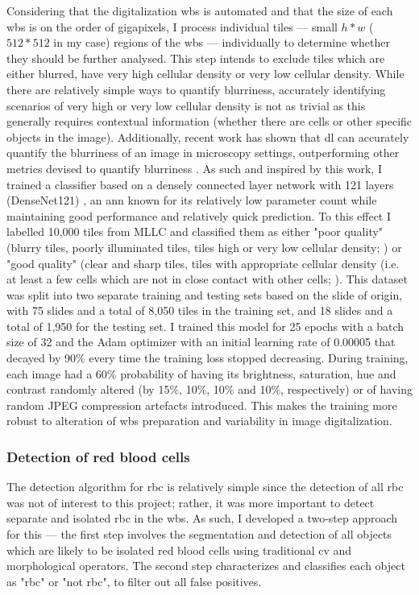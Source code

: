 Considering that the digitalization \ac{wbs} is automated and that the size of each \ac{wbs} is on the order of gigapixels, I process individual tiles --- small $h*w$ ($512*512$ in my case) regions of the \ac{wbs} --- individually to determine whether they should be further analysed. This step intends to exclude tiles which are either blurred, have very high cellular density or very low cellular density. While there are relatively simple ways to quantify blurriness, accurately identifying scenarios of very high or very low cellular density is not as trivial as this generally requires contextual information (whether there are cells or other specific objects in the image). Additionally, recent work has shown that \ac{dl} can accurately quantify the blurriness of an image in microscopy settings, outperforming other metrics devised to quantify blurriness \cite{Yang2018-ve}. As such and inspired by this work, I trained a classifier based on a densely connected layer network with 121 layers (DenseNet121) \cite{huang2017densely}, an \ac{ann} known for its relatively low parameter count while maintaining good performance and relatively quick prediction. To this effect I labelled 10,000 tiles from MLLC and classified them as either "poor quality" (blurry tiles, poorly illuminated tiles, tiles high or very low cellular density; ) or "good quality" (clear and sharp tiles, tiles with appropriate cellular density (i.e. at least a few cells which are not in close contact with other cells; ). This dataset was split into two separate training and testing sets based on the slide of origin, with 75 slides and a total of 8,050 tiles in the training set, and 18 slides and a total of 1,950 for the testing set. I trained this model for 25 epochs with a batch size of 32 and the Adam optimizer with an initial learning rate of 0.00005 that decayed by 90\% every time the training loss stopped decreasing. During training, each image had a 60\% probability of having its brightness, saturation, hue and contrast randomly altered (by 15\%, 10\%, 10\% and 10\%, respectively) or of having random JPEG compression artefacts introduced. This makes the training more robust to alteration of \ac{wbs} preparation and variability in image digitalization.

\subsubsection{Detection of red blood cells}

The detection algorithm for \ac{rbc} is relatively simple since the detection of all \ac{rbc} was not of interest to this project; rather, it was more important to detect separate and isolated \ac{rbc} in the \ac{wbs}. As such, I developed a two-step approach for this --- the first step involves the segmentation and detection of all objects which are likely to be isolated red blood cells using traditional \ac{cv} and morphological operators. The second step characterizes and classifies each object as "\ac{rbc}" or "not \ac{rbc}", to filter out all false positives.

